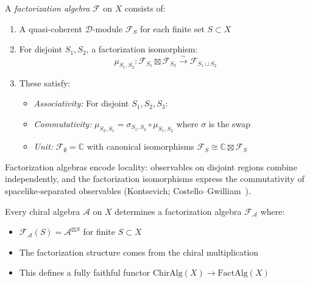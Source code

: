 \begin{definition}\label{def:fact-algebra-correct}
A \emph{factorization algebra} $\mathcal{F}$ on $X$ consists of:
\begin{enumerate}
\item A quasi-coherent $\mathcal{D}$-module $\mathcal{F}_S$ for each finite set $S \subset X$
\item For disjoint $S_1, S_2$, a factorization isomorphism:
 \[\mu_{S_1,S_2}: \mathcal{F}_{S_1} \boxtimes \mathcal{F}_{S_2} \xrightarrow{\sim} \mathcal{F}_{S_1 \sqcup S_2}\]
\item These satisfy:
 \begin{itemize}
 \item \emph{Associativity:} For disjoint $S_1, S_2, S_3$:
 \begin{center}
 \end{center}
 \item \emph{Commutativity:} $\mu_{S_2,S_1} = \sigma_{S_1,S_2} \circ \mu_{S_1,S_2}$ where $\sigma$ is the swap
 \item \emph{Unit:} $\mathcal{F}_\emptyset = \mathbb{C}$ with canonical isomorphisms $\mathcal{F}_S \cong \mathbb{C} \boxtimes \mathcal{F}_S$
 \end{itemize}
\end{enumerate}
\end{definition}

\begin{remark}
Factorization algebras encode locality: observables
on disjoint regions combine independently, and the factorization isomorphisms express the commutativity of spacelike-separated observables (Kontsevich; Costello--Gwilliam~\cite{CG17}).
\end{remark}

\begin{theorem}\label{thm:chiral-as-fact}
Every chiral algebra $\mathcal{A}$ on $X$ determines a factorization algebra $\mathcal{F}_\mathcal{A}$ where:
\begin{itemize}
\item $\mathcal{F}_\mathcal{A}(S) = \mathcal{A}^{\boxtimes S}$ for finite $S \subset X$
\item The factorization structure comes from the chiral multiplication
\item This defines a fully faithful functor $\text{ChirAlg}(X) \to \text{FactAlg}(X)$
\end{itemize}
\end{theorem}

